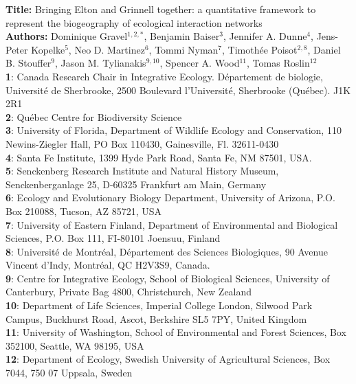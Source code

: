 \documentclass[12pt]{article}
\begin{document}
\linenumbers
\modulolinenumbers[1]

\textbf{Title:} Bringing Elton and Grinnell together: a quantitative framework
to represent the biogeography of ecological interaction networks\\

\textbf{Authors:} Dominique Gravel$^{1,2,*}$, Benjamin Baiser$^{3}$, Jennifer
A. Dunne$^{4}$, Jens-Peter Kopelke$^{5}$, Neo D. Martinez$^{6}$, Tommi
Nyman$^{7}$, Timothée Poisot$^{2,8}$, Daniel B.
Stouffer$^{9}$, Jason M. Tylianakis$^{9,10}$, Spencer A. Wood$^{11}$, Tomas Roslin$^{12}$ \\

\textbf{1}: Canada Research Chair in Integrative Ecology. Département de
biologie, Université de Sherbrooke, 2500 Boulevard l'Université,
Sherbrooke (Québec). J1K 2R1\\
\textbf{2}: Québec Centre for Biodiversity Science\\
\textbf{3}: University of Florida, Department of Wildlife Ecology and Conservation, 110 Newins-Ziegler Hall, PO Box 110430, Gainesville, Fl. 32611-0430 \\
\textbf{4}: Santa Fe Institute, 1399 Hyde Park Road, Santa Fe, NM 87501, USA.\\
\textbf{5}: Senckenberg Research Institute and Natural History Museum, Senckenberganlage 25, D-60325 Frankfurt am Main, Germany\\
\textbf{6}: Ecology and Evolutionary Biology Department, University of Arizona, P.O. Box 210088, Tucson, AZ 85721, USA\\
\textbf{7}: University of Eastern Finland, Department of Environmental and Biological Sciences, P.O. Box 111, FI-80101 Joensuu, Finland\\
\textbf{8}: Université de Montréal, Département des Sciences Biologiques, 90 Avenue Vincent d’Indy, Montréal, QC H2V3S9, Canada.\\
\textbf{9}: Centre for Integrative Ecology, School of Biological Sciences, University of Canterbury, Private Bag 4800, Christchurch, New Zealand\\
\textbf{10}: Department of Life Sciences, Imperial College London, Silwood Park Campus, 
Buckhurst Road, Ascot, Berkshire SL5 7PY, United Kingdom\\
\textbf{11}: University of Washington, School of Environmental and Forest Sciences,
Box 352100, Seattle, WA 98195, USA\\
\textbf{12}: Department of Ecology, Swedish University of Agricultural Sciences, Box 7044, 750 07 Uppsala, Sweden\\
\end{document}
